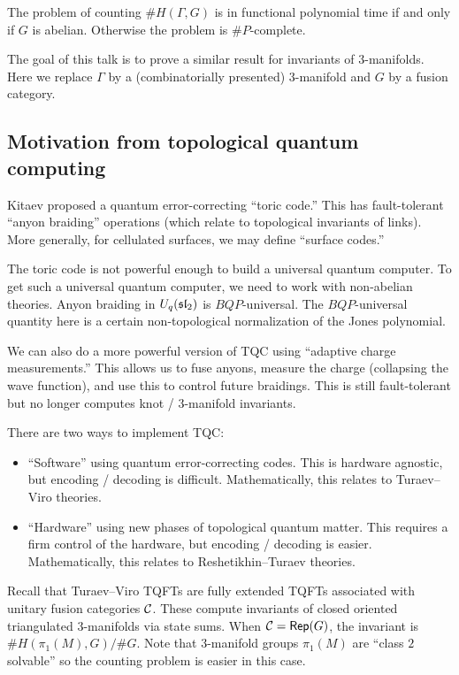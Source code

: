\documentclass{amsart}
\begin{document}
\begin{thm}
  The problem of counting $\#H(\Gamma, G)$ is in functional polynomial time if and only if $G$ is abelian.
  Otherwise the problem is $\#P$-complete.
\end{thm}

The goal of this talk is to prove a similar result for invariants of $3$-manifolds.
Here we replace $\Gamma$ by a (combinatorially presented) $3$-manifold and $G$ by a fusion category.

\subsection{Motivation from topological quantum computing}

Kitaev proposed a quantum error-correcting ``toric code.''
This has fault-tolerant ``anyon braiding'' operations (which relate to topological invariants of links).
More generally, for cellulated surfaces, we may define ``surface codes.''

The toric code is not powerful enough to build a universal quantum computer.
To get such a universal quantum computer, we need to work with non-abelian theories.
Anyon braiding in $U_q(\sl_2)$ is $BQP$-universal.
The $BQP$-universal quantity here is a certain non-topological normalization of the Jones polynomial.

We can also do a more powerful version of TQC using ``adaptive charge measurements.''
This allows us to fuse anyons, measure the charge (collapsing the wave function), and use this to control future braidings.
This is still fault-tolerant but no longer computes knot / $3$-manifold invariants.

There are two ways to implement TQC:
\begin{itemize}
  \item ``Software'' using quantum error-correcting codes.
    This is hardware agnostic, but encoding / decoding is difficult.
    Mathematically, this relates to Turaev--Viro theories.
  \item ``Hardware'' using new phases of topological quantum matter.
    This requires a firm control of the hardware, but encoding / decoding is easier.
    Mathematically, this relates to Reshetikhin--Turaev theories.
\end{itemize}

Recall that Turaev--Viro TQFTs are fully extended TQFTs associated with unitary fusion categories $\Cc$.
These compute invariants of closed oriented triangulated $3$-manifolds via state sums.
When $\Cc = \Rep(G)$, the invariant is $\#H(\pi_1(M), G) / \#G$.
Note that $3$-manifold groups $\pi_1(M)$ are ``class $2$ solvable'' so the counting problem is easier in this case.
\end{document}
